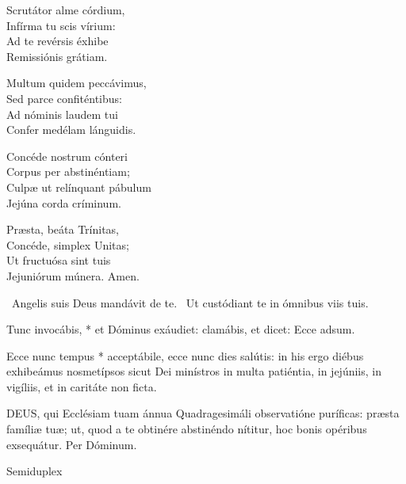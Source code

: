 Scrutátor alme córdium,\\
Infírma tu scis vírium:\\
Ad te revérsis éxhibe\\
Remissiónis grátiam.

Multum quidem peccávimus,\\
Sed parce confiténtibus:\\
Ad nóminis laudem tui\\
Confer medélam lánguidis.

Concéde nostrum cónteri\\
Corpus per abstinéntiam;\\
Culpæ ut relínquant pábulum\\
Jejúna corda críminum.


Præsta, beáta Trínitas,\\
Concéde, simplex Unitas;\\
Ut fructuósa sint tuis\\
Jejuniórum múnera. Amen.

\V\ Angelis suis Deus mandávit de te. \R\ Ut custódiant te in ómnibus viis tuis.

 Tunc invocábis, * et Dóminus exáudiet: clamábis, et dicet: Ecce adsum.


 Ecce nunc tempus * acceptábile, ecce nunc dies salútis: in his ergo diébus exhibeámus nosmetípsos sicut Dei minístros in multa patiéntia, in jejúniis, in vigíliis, et in caritáte non ficta.


\lettrine[lines=2]{D}{EUS}, qui Ecclésiam tuam ánnua Quadragesimáli observatióne puríficas: præsta famíliæ tuæ; ut, quod a te obtinére abstinéndo nítitur, hoc bonis opéribus exsequátur. Per Dóminum.

\sectionornament


 Semiduplex




